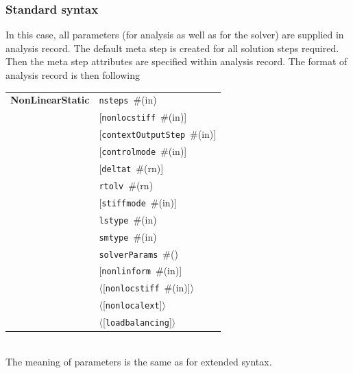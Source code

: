 \documentclass[a4paper]{article}
\makeatletter
\newcommand{\param}[1]{\texttt{#1}} %
\newcommand{\optional}[1]{[#1]} %
\newcommand{\field}[2]{\param{#1}~\#{\tiny(#2)}} %
\newcommand{\optField}[2]{\optional{\field{#1}{#2}}}
\newcommand{\optFieldnotype}[1]{[\param{#1}]}
\newcommand{\entKeywordInst}[1]{\textbf{#1}} %
\newcommand{\oofemParallel}[1]{$\langle${#1}$\rangle$}
\newcommand{\PoptField}[2]{\oofemParallel{\optField{#1}{#2}}}
\newcommand{\PoptFieldnotype}[1]{\oofemParallel{\optFieldnotype{#1}}}
\newenvironment{record}[1][]{\begin{tabular}{|ll}}{\end{tabular}\\}
\newcommand{\recentry}[2]{{#1}&{#2}\\}
\newcounter{rcc}
\newenvironment{record}[1][\textwidth]{\setcounter{rcc}{0}\begin{tabular*}{#1}{|ll@{\extracolsep{\fill}}r}}{\end{tabular*}\\}
\newcommand{\recentry}[2]{\ifthenelse{\value{rcc}>0}{&$\backslash$ \\}{\setcounter{rcc}{1}}{#1}&{#2}}
\makeatother
\begin{document}
\subsubsection{Standard syntax}
In this case, all parameters (for analysis as well as for the solver)
are supplied in analysis record. The default meta step is created for
all solution steps required. Then the meta step attributes are
specified within analysis record. The format of analysis record is
then following\\

\noindent
\begin{record}
  \recentry{\entKeywordInst{NonLinearStatic}}{\field{nsteps}{in}}
  \recentry{}{\optField{nonlocstiff}{in}}
  \recentry{}{\optField{contextOutputStep}{in}}
  \recentry{}{\optField{controlmode}{in}}
  \recentry{}{\optField{deltat}{rn}}
  \recentry{}{\field{rtolv}{rn}}
  \recentry{}{\optField{stiffmode}{in}}
  \recentry{}{\field{lstype}{in}}
  \recentry{}{\field{smtype}{in}}
  \recentry{}{\field{solverParams}{}}
  \recentry{}{\optField{nonlinform}{in}}
  \recentry{}{\PoptField{nonlocstiff}{in}}
  \recentry{}{\PoptFieldnotype{nonlocalext}}
  \recentry{}{\PoptFieldnotype{loadbalancing}}
\end{record}
The meaning of parameters is the same as for extended syntax.

%
\end{document}
